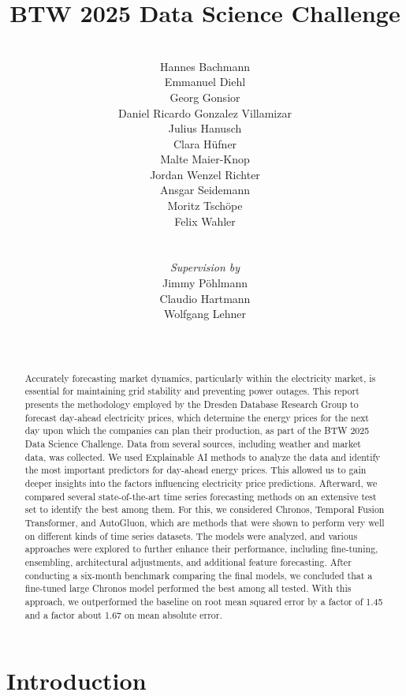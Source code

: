 \documentclass[a4paper]{article}
\title{BTW 2025 Data Science Challenge}
\author{\\Hannes Bachmann\\Emmanuel Diehl\\Georg Gonsior\\Daniel Ricardo Gonzalez Villamizar\\Julius Hanusch\\Clara Hüfner\\Malte Maier-Knop\\Jordan Wenzel Richter\\Ansgar Seidemann\\Moritz Tschöpe\\Felix Wahler\\\\\\\textit{Supervision by}\\Jimmy Pöhlmann\\Claudio Hartmann\\Wolfgang Lehner\\\\\\}
\begin{document}
    
    \maketitle
    
    

    
    

    \thispagestyle{empty}
\newpage\begin{abstract}
\label{abstract}

Accurately forecasting market dynamics, particularly within the
electricity market, is essential for maintaining grid stability and
preventing power outages. This report presents the methodology employed
by the Dresden Database Research Group to forecast day-ahead electricity
prices, which determine the energy prices for the next day upon which
the companies can plan their production, as part of the BTW 2025 Data
Science Challenge. Data from several sources, including weather and
market data, was collected. We used Explainable AI methods to analyze
the data and identify the most important predictors for day-ahead energy
prices. This allowed us to gain deeper insights into the factors
influencing electricity price predictions. Afterward, we compared
several state-of-the-art time series forecasting methods on an extensive
test set to identify the best among them. For this, we considered
Chronos, Temporal Fusion Transformer, and AutoGluon, which are methods
that were shown to perform very well on different kinds of time series
datasets. The models were analyzed, and various approaches were explored
to further enhance their performance, including fine-tuning, ensembling,
architectural adjustments, and additional feature forecasting. After
conducting a six-month benchmark comparing the final models, we
concluded that a fine-tuned large Chronos model performed the best among
all tested. With this approach, we outperformed the baseline on root
mean squared error by a factor of 1.45 and a factor about 1.67 on mean
absolute error.

    \end{abstract}
\thispagestyle{empty}
\newpage
\thispagestyle{empty}
\hypersetup{linkcolor=black}
\tableofcontents
\thispagestyle{empty}
\newpage\section{Introduction}\label{introduction}
\end{document}
